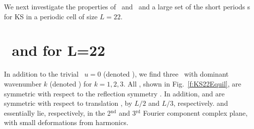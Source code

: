 We next investigate the properties of \eqva\ and \reqva\ and a large set
of the short periods \rpo s for KS in a periodic cell of
size $L=22$.

\section{\Eqva\ and \reqva for L=22}

In addition to the trivial \eqv\ $u=0$ (denoted ),
we find three \eqva\ with dominant wavenumber $k$
(denoted ) for $k = 1, 2, 3$.  All {\eqva}, shown in
Fig.~\ref{f:KS22Equil}, are symmetric with respect to the reflection
symmetry .
In addition,  and  are symmetric with respect
to translation , by $L/2$ and $L/3$, respectively.
 and  essentially lie, respectively, in
the 2$^\mathrm{nd}$ and 3$^\mathrm{rd}$ Fourier component complex plane,
with small deformations from  harmonics.


